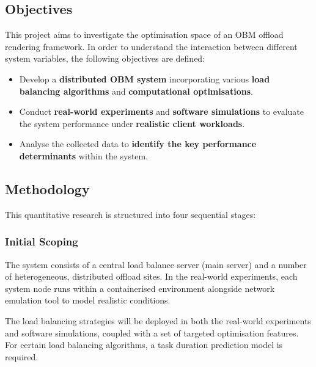 \documentclass[11pt,a4paper]{article}
\begin{document}
\subsection{Objectives}

This project aims to investigate the optimisation space of an OBM offload rendering framework.
In order to understand the interaction between different system variables, the following objectives are defined:
\begin{itemize}
    \item Develop a \textbf{distributed OBM system} incorporating various \textbf{load balancing algorithms} and \textbf{computational optimisations}.
    \item Conduct \textbf{real-world experiments} and \textbf{software simulations} to evaluate the system performance under \textbf{realistic client workloads}.
    \item Analyse the collected data to \textbf{identify the key performance determinants} within the system.
\end{itemize}

\subsection{Methodology}

This quantitative research is structured into four sequential stages:

\subsubsection{Initial Scoping}
\label{sec:Scoping}

The system consists of a central load balance server (main server) and a number of heterogeneous, distributed offload sites.
In the real-world experiments, each system node runs within a containerised environment alongside network emulation tool to model realistic conditions.

The load balancing strategies will be deployed in both the real-world experiments and software simulations,
coupled  with a set of targeted optimisation features.
For certain load balancing algorithms, a task duration prediction model is required.
\end{document}

